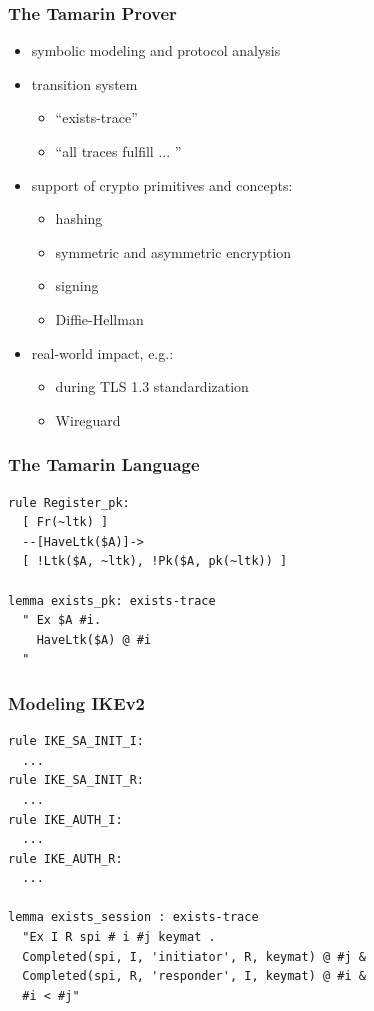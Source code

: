 \documentclass{beamer}
\begin{document}
\begin{frame}
\frametitle{The Tamarin Prover}
\underline{}
\begin{itemize}
	\item symbolic modeling and protocol analysis
	\pause
	\item transition system
	\begin{itemize}
		\item ``exists-trace''
		\item ``all traces fulfill ... ''
	\end{itemize}
	\pause
	\item support of crypto primitives and concepts:
	\begin{itemize}
		\item hashing
		\item symmetric and asymmetric encryption
		\item signing
		\item Diffie-Hellman
	\end{itemize}
	\pause
	\item real-world impact, e.g.:
	\begin{itemize}
		\item during TLS 1.3 standardization
		\item Wireguard
	\end{itemize}
\end{itemize}
\end{frame}

\begin{frame}[fragile]
\frametitle{The Tamarin Language}

\begin{lstlisting}[language=Tamarin]
rule Register_pk:
  [ Fr(~ltk) ]
  --[HaveLtk($A)]->
  [ !Ltk($A, ~ltk), !Pk($A, pk(~ltk)) ]

lemma exists_pk: exists-trace
  " Ex $A #i.
    HaveLtk($A) @ #i
  "
\end{lstlisting}

\end{frame}

\begin{frame}[fragile]
\frametitle{Modeling IKEv2}
\begin{lstlisting}[language=Tamarin]
rule IKE_SA_INIT_I:
  ...
rule IKE_SA_INIT_R:
  ...
rule IKE_AUTH_I:
  ...
rule IKE_AUTH_R:
  ...

lemma exists_session : exists-trace
  "Ex I R spi # i #j keymat .
  Completed(spi, I, 'initiator', R, keymat) @ #j &
  Completed(spi, R, 'responder', I, keymat) @ #i &
  #i < #j"
\end{lstlisting}
\end{frame}
\end{document}
